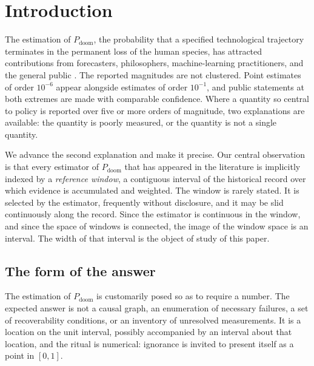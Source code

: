 \documentclass[11pt]{article}
\theoremstyle{remark}
\newcommand{\PD}{P_{\mathrm{doom}}}
\begin{document}
\tableofcontents
\newpage

\section{Introduction}

The estimation of $\PD$, the probability that a specified technological trajectory terminates in the permanent loss of the human species, has attracted contributions from forecasters, philosophers, machine-learning practitioners, and the general public \cite{ord2020,tetlock2015}. The reported magnitudes are not clustered. Point estimates of order $10^{-6}$ appear alongside estimates of order $10^{-1}$, and public statements at both extremes are made with comparable confidence. Where a quantity so central to policy is reported over five or more orders of magnitude, two explanations are available: the quantity is poorly measured, or the quantity is not a single quantity.

We advance the second explanation and make it precise. Our central observation is that every estimator of $\PD$ that has appeared in the literature is implicitly indexed by a \emph{reference window}, a contiguous interval of the historical record over which evidence is accumulated and weighted. The window is rarely stated. It is selected by the estimator, frequently without disclosure, and it may be slid continuously along the record. Since the estimator is continuous in the window, and since the space of windows is connected, the image of the window space is an interval. The width of that interval is the object of study of this paper.

\subsection{The form of the answer}

The estimation of $\PD$ is customarily posed so as to require a number. The expected answer is not a causal graph, an enumeration of necessary failures, a set of recoverability conditions, or an inventory of unresolved measurements. It is a location on the unit interval, possibly accompanied by an interval about that location, and the ritual is numerical: ignorance is invited to present itself as a point in $[0,1]$.
\end{document}
